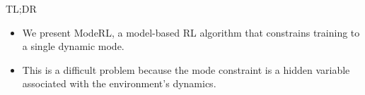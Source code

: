 \documentclass[final,11pt]{beamer}
\newlength{\colwidth}
\begin{document}
\begin{frame}[t]
\begin{columns}[t]
\begin{column}{\colwidth}

  \begin{alertblock}{TL;DR}

   \begin{itemize}
      \item We present \alert{ModeRL}, a model-based RL algorithm that constrains training to a single dynamic mode.
      \item This is a difficult problem because the \alert{mode constraint} is a \alert{hidden variable} associated with the environment’s dynamics.


\end{itemize}
\end{alertblock}
\end{column}
\end{columns}
\end{frame}
\end{document}
